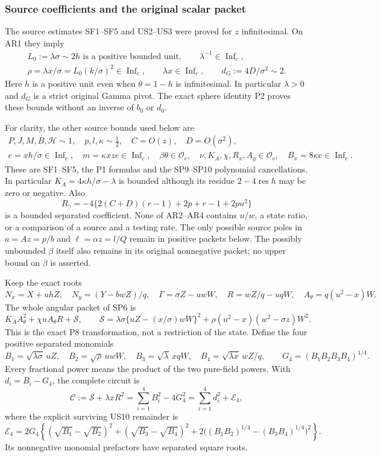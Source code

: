 \subsubsection*{Source coefficients and the original scalar packet}

The source estimates SF1--SF5 and US2--US3 were proved for
$z$ infinitesimal. On AR1 they imply
\[
 \begin{gathered}
 L_0:=\lambda\sigma\sim2h\text{ is a positive bounded unit},
 \qquad \lambda^{-1}\in\operatorname{Inf}_c,\\
 \rho=\lambda x/\sigma=L_0(k/\sigma)^2\in\operatorname{Inf}_c,
 \qquad \lambda x\in\operatorname{Inf}_c,
 \qquad d_G:=4D/\sigma^2\sim2. 
 \end{gathered} \tag{AR2}
\]
Here $h$ is a positive unit even when $\theta=1-h$ is
infinitesimal. In particular $\lambda>0$ and $d_G$ is a strict
original Gamma pivot. The exact sphere identity P2 proves these
bounds without an inverse of $b_0$ or $d_0$.

For clarity, the other source bounds used below are
\[
 \begin{gathered}
 P,J,M,B,\mathcal H\sim1,\quad p,l,\kappa\sim\tfrac12,
 \quad C=O(z),\quad D=O(\sigma^2),\\
 e=xh/\sigma\in\operatorname{Inf}_c,\quad
 m=\kappa xze\in\operatorname{Inf}_c,\quad
 \beta\theta\in\mathcal O_c,\quad
 \nu,K_A,\chi,R_x,A_y\in\mathcal O_c,
 \quad B_x=8\kappa e\in\operatorname{Inf}_c.
 \end{gathered} \tag{AR3}
\]
These are SF1--SF5, the P1 formulas and the SP9--SP10 polynomial
cancellations. In particular $K_A=4\kappa h/\sigma-\lambda$
is bounded although its residue $2-4\operatorname{res}h$ may be
zero or negative. Also
\[
 R_\gamma=-4\{2(C+D)(r-1)+2p+r-1+2pu^2\}
 \tag{AR4}
\]
is a bounded separated coefficient. None of AR2--AR4 contains
$u/w$, a state ratio, or a comparison of a source and a testing
rate. The only possible source poles in $a=Az=p/b$ and
$\ell=\alpha z=l/Q$ remain in positive packets below. The
possibly unbounded $\beta$ itself also remains in its original
nonnegative packet; no upper bound on $\beta$ is asserted.

Keep the exact roots
\[
 N_x=X+uhZ,\quad N_y=(Y-bwZ)/q,\quad
 \Gamma=\sigma Z-uwW,\quad R=wZ/q-uqW,
 \quad A_\theta=q(u^2-x)W.
 \tag{AR5}
\]
The whole angular packet of SP6 is
\[
 K_AA_\theta^2+\chi uA_\theta R+\mathscr S,
 \qquad
 \mathscr S=\lambda\sigma\{uZ-(x/\sigma)wW\}^2
       +\rho(u^2-x)(w^2-\sigma z)W^2.
 \tag{AR6}
\]
This is the exact P8 transformation, not a restriction of the state.
Define the four positive separated monomials
\[
 B_1=\sqrt{\lambda\sigma}\,uZ,\quad
 B_2=\sqrt\rho\,uwW,\quad
 B_3=\sqrt\lambda\,xqW,\quad
 B_4=\sqrt{\lambda x}\,wZ/q,
 \qquad G_4=(B_1B_2B_3B_4)^{1/4}.
 \tag{AR7}
\]
Every fractional power means the product of the two pure-field
powers. With $d_i=B_i-G_4$, the complete circuit is
\[
 \mathscr C:=\mathscr S+\lambda xR^2
       =\sum_{i=1}^4B_i^2-4G_4^2
       =\sum_{i=1}^4d_i^2+\mathcal E_4,
 \tag{AR8}
\]
where the explicit surviving US10 remainder is
\[
 \mathcal E_4=2G_4\left\{
 (\sqrt{B_1}-\sqrt{B_2})^2+
 (\sqrt{B_3}-\sqrt{B_4})^2+
 2\big((B_1B_2)^{1/4}-(B_3B_4)^{1/4}\big)^2\right\}.
 \tag{AR9}
\]
Its nonnegative monomial prefactors have separated square roots.

